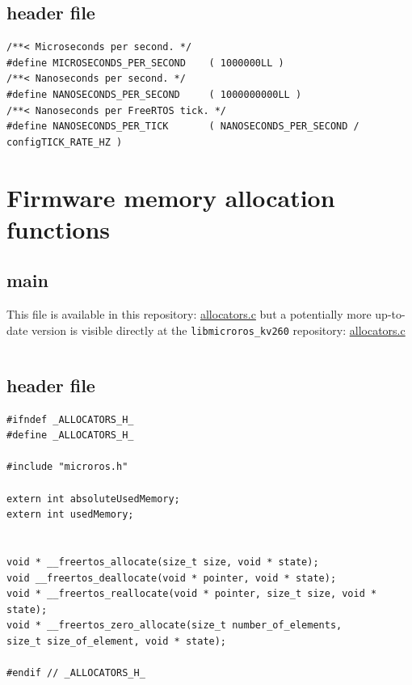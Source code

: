 \documentclass[10pt]{article}
\begin{document}
\subsection{header file}
\label{sec:org57ecba1}
\begin{verbatim}
/**< Microseconds per second. */
#define MICROSECONDS_PER_SECOND    ( 1000000LL )  
/**< Nanoseconds per second. */
#define NANOSECONDS_PER_SECOND     ( 1000000000LL ) 
/**< Nanoseconds per FreeRTOS tick. */  
#define NANOSECONDS_PER_TICK       ( NANOSECONDS_PER_SECOND / configTICK_RATE_HZ ) 
\end{verbatim}


\pagebreak
\section{Firmware memory allocation functions}
\label{sec:org5e20141}

\subsection{main}
\label{sec:orgc7c05fa}
This file is available in this repository: \href{https://gitlab.com/sunoc/xilinx-kria-kv260-documentation/-/blob/b7300116e153f4b5a1542f8804e4646db8030033/src/allocators.c}{allocators.c}
but a potentially more up-to-date version is visible
directly at the \texttt{libmicroros\_kv260} repository: \href{https://gitlab.com/sunoc/libmicroros\_kv260/-/blob/4867e762f66af7b4647232eb4c0a31106db66e13/src/allocators.c}{allocators.c}

\inputminted[linenos, frame=single]{c}{./src/allocators.c}

\subsection{header file}
\label{sec:orgb97da35}
\begin{verbatim}
#ifndef _ALLOCATORS_H_
#define _ALLOCATORS_H_

#include "microros.h"

extern int absoluteUsedMemory;
extern int usedMemory;


void * __freertos_allocate(size_t size, void * state);
void __freertos_deallocate(void * pointer, void * state);
void * __freertos_reallocate(void * pointer, size_t size, void * state);
void * __freertos_zero_allocate(size_t number_of_elements,
size_t size_of_element, void * state);

#endif // _ALLOCATORS_H_
\end{verbatim}
\end{document}
